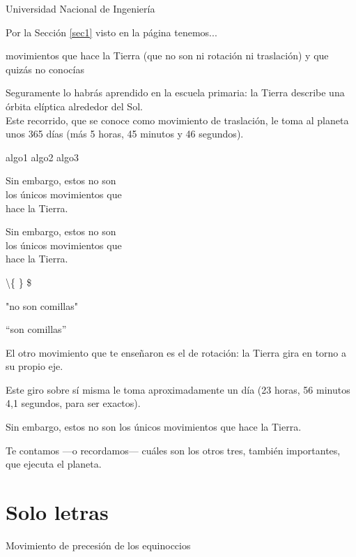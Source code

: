 \documentclass[12pt,a4paper]{article}
\begin{document}
\centerline{Universidad Nacional de Ingeniería}

Por la Sección \ref{sec1}  visto en la página \pageref{sec1}  tenemos...

 movimientos que hace la Tierra (que no son ni rotación ni traslación) 
y que quizás no conocías\newline


\noindent Seguramente lo habrás aprendido en la escuela primaria: la Tierra describe una órbita elíptica alrededor del Sol.\\[2cm]

Este recorrido, que se conoce como movimiento de traslación, le toma al planeta unos 365 días 
(más 5 horas, 45 minutos y 46 segundos).

\begin{flushright}
	algo1 algo2 algo3
\end{flushright}

\begin{flushright}
Sin embargo, estos no son\\ los únicos movimientos que\\ hace la Tierra.
\end{flushright}

\begin{flushleft}
	Sin embargo, estos no son\\ los únicos movimientos que\\ hace la Tierra.
\end{flushleft}

\textbackslash \{ \} \$

"no son comillas"

``son comillas''

El otro movimiento que te enseñaron es el de rotación: la Tierra gira en torno a su propio eje.

Este giro sobre sí misma le toma aproximadamente un día (23 horas, 56 minutos 4,1 segundos, para ser exactos). 

Sin embargo, estos no son los únicos movimientos que hace la Tierra.

Te contamos —o recordamos— cuáles son los otros tres, también importantes, que ejecuta el planeta.


\section{Solo letras}


Movimiento de precesión de los equinoccios
\end{document}
